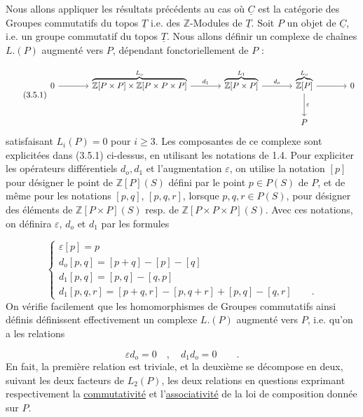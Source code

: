 Nous allons appliquer les résultats précédents au cas où $\underline{C}$ est la catégorie des Groupes commutatifs du topos $\underline{T}$ i.e. des $\mathbb{Z}$-Modules de $\underline{T}$. Soit $P$ un objet de $\underline{C}$, i.e. un groupe commutatif du topos $\underline{T}$. Nous allons définir un complexe de chaînes $L.(P)$ augmenté vers $P$, dépendant fonctoriellement de $P$ :



\begin{equation}\tag{3.5.1}
\begin{tikzcd}[column sep=large, row sep=large]
0 \arrow[r] & \overbrace{\mathbb{Z}[P\times P]\times\mathbb{Z}[P\times P\times P]}^{L_o} \arrow[r, "d_1"] & \overbrace{\mathbb{Z}[P\times P]}^{L_1} \arrow[r, "d_o"] & \overbrace{\mathbb{Z}[P]}^{L_o} \arrow[r] \arrow[d, "\varepsilon"] & 0 \\
& & & P &
\end{tikzcd}
\end{equation}
 satisfaisant $L_i(P)=0$ pour $i \geq 3$. Les composantes de ce complexe sont explicitées dans (3.5.1) ci-dessus, en utilisant les notations de 1.4. Pour expliciter les opérateurs différentiels $d_o,d_1$ et l'augmentation $\varepsilon$, on utilise la notation $[p]$ pour désigner le point de $\mathbb{Z}[P](S)$ défini par le point $p \in P(S)$ de $P$, et de même pour les notations $[p,q]$, $[p,q,r]$, lorsque $p,q,r \in P(S)$, pour désigner des éléments de $\mathbb{Z}[P\times P](S)$ resp. de $\mathbb{Z}[P\times P\times P](S)$. Avec ces notations, on définira $\varepsilon$, $d_o$ et $d_1$ par les formules

\begin{equation}\tag{3.5.2}
\left\{
\begin{array}{l}
\varepsilon[p] = p \\[1.5ex]
d_o[p,q]= [p+q] - [p] - [q] \\[1.5ex]
d_1[p,q]= [p,q] - [q,p] \\[1.5ex]
d_1[p,q,r] = [p+q,r] - [p,q+r] + [p,q] - [q,r] \qquad .
\end{array}
\right.
\end{equation}
On vérifie facilement que les homomorphismes de Groupes commutatifs ainsi définis définissent effectivement un complexe $L.(P)$ augmenté vers $P$, i.e. qu'on a les relations

\begin{equation*}
\varepsilon d_o = 0 \quad , \quad d_1 d_o = 0 \qquad .
\end{equation*}
En fait, la première relation est triviale, et la deuxième se décompose en deux, suivant les deux facteurs de $L_2(P)$, les deux relations en questions exprimant respectivement la \underline{commutativité} et l'\underline{associativité} de la
loi de composition donnée sur $P$.


